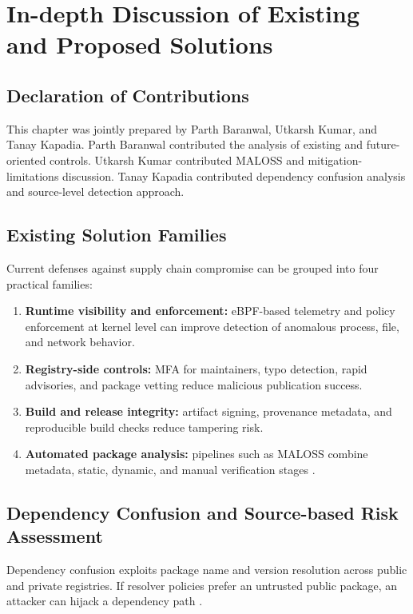 \chapter{In-depth Discussion of Existing and Proposed Solutions}
\label{ch:solutions}

\section*{Declaration of Contributions}
This chapter was jointly prepared by Parth Baranwal, Utkarsh Kumar, and Tanay Kapadia.
Parth Baranwal contributed the analysis of existing and future-oriented controls.
Utkarsh Kumar contributed MALOSS and mitigation-limitations discussion.
Tanay Kapadia contributed dependency confusion analysis and source-level detection approach.

\section{Existing Solution Families}

Current defenses against supply chain compromise can be grouped into four practical families:

\begin{enumerate}
\item \textbf{Runtime visibility and enforcement:} eBPF-based telemetry and policy enforcement
at kernel level can improve detection of anomalous process, file, and network behavior.
\item \textbf{Registry-side controls:} MFA for maintainers, typo detection, rapid advisories,
and package vetting reduce malicious publication success.
\item \textbf{Build and release integrity:} artifact signing, provenance metadata, and reproducible
build checks reduce tampering risk.
\item \textbf{Automated package analysis:} pipelines such as MALOSS combine metadata,
static, dynamic, and manual verification stages \citep{duan2021ndss}.
\end{enumerate}

\section{Dependency Confusion and Source-based Risk Assessment}

Dependency confusion exploits package name and version resolution across public and private
registries. If resolver policies prefer an untrusted public package, an attacker can hijack a
dependency path \citep{birsan2021dependencyconfusion}.

